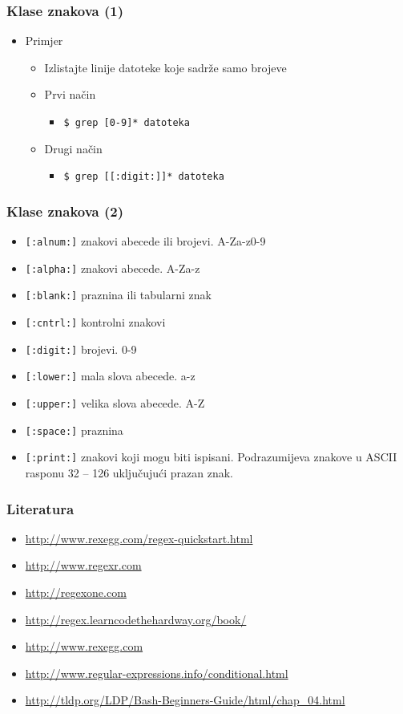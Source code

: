 \documentclass[table,usenames,dvipsnames]{beamer}
\newcommand{\shell}[1]{\texttt{#1}}
\begin{document}
\begin{frame}[t]
\frametitle{Klase znakova (1)}
\begin{itemize}
  \item Primjer
  \begin{itemize}
    \item Izlistajte linije datoteke koje sadrže samo brojeve
    \item Prvi način
    \begin{itemize}
      \item[] \shell{\$ grep [0-9]* datoteka}
    \end{itemize}
    \item Drugi način
    \begin{itemize}
      \item[] \shell{\$ grep [[:digit:]]* datoteka}
    \end{itemize}
  \end{itemize}
\end{itemize}
\end{frame}

\begin{frame}[t]
\frametitle{Klase znakova (2)}
\begin{itemize}
  \item \shell{[:alnum:]} znakovi abecede ili brojevi. A-Za-z0-9
  \item \shell{[:alpha:]} znakovi abecede. A-Za-z 
  \item \shell{[:blank:]} praznina ili tabularni znak
  \item \shell{[:cntrl:]} kontrolni znakovi
  \item \shell{[:digit:]} brojevi. 0-9
  \item \shell{[:lower:]} mala slova abecede. a-z
  \item \shell{[:upper:]} velika slova abecede. A-Z
  \item \shell{[:space:]} praznina
  \item \shell{[:print:]} znakovi koji mogu biti ispisani. Podrazumijeva 
        znakove u ASCII rasponu 32 – 126 uključujući prazan znak.
\end{itemize}
\end{frame}

\begin{frame}[t]
\frametitle{Literatura}
\begin{itemize}
  \item[] \small\url{http://www.rexegg.com/regex-quickstart.html}
  \item[] \small\url{http://www.regexr.com}
  \item[] \small\url{http://regexone.com}
  \item[] \small\url{http://regex.learncodethehardway.org/book/}
  \item[] \small\url{http://www.rexegg.com}
  \item[] \small\url{http://www.regular-expressions.info/conditional.html} 
  \item[] \small\url{http://tldp.org/LDP/Bash-Beginners-Guide/html/chap_04.html}
\end{itemize}
\end{frame}
\end{document}
